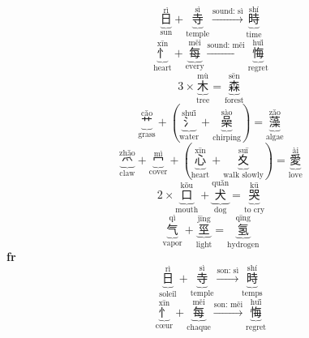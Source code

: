 \documentclass[12pt]{article}\usepackage[margin=1.5cm]{geometry}
\begin{document}
\[ \underbrace{\overset{\text{rì}}{\text{日}}}_{\text{sun}} + \underbrace{\overset{\text{sì}}{\text{寺}}}_{\text{temple}} \xrightarrow{\text{sound: sì}} \underbrace{\overset{\text{shí}}{\text{時}}}_{\text{time}} \]
\[ \underbrace{\overset{\text{xīn}}{\text{忄}}}_{\text{heart}} + \underbrace{\overset{\text{měi}}{\text{每}}}_{\text{every}} \xrightarrow{\text{sound: měi}} \underbrace{\overset{\text{huǐ}}{\text{悔}}}_{\text{regret}} \]
\[ 3\times \underbrace{\overset{\text{mù}}{\text{木}}}_{\text{tree}} = \underbrace{\overset{\text{sēn}}{\text{森}}}_{\text{forest}} \]
\[ \underbrace{\overset{\text{cǎo}}{\text{艹}}}_{\text{grass}} + \left(\underbrace{\overset{\text{shuǐ}}{\text{氵}}}_{\text{water}} + \underbrace{\overset{\text{sào}}{\text{喿}}}_{\text{chirping}}\right) = \underbrace{\overset{\text{zǎo}}{\text{藻}}}_{\text{algae}} \]
\[ \underbrace{\overset{\text{zhǎo}}{\text{爫}}}_{\text{claw}} + \underbrace{\overset{\text{mì}}{\text{冖}}}_{\text{cover}} + \left(\underbrace{\overset{\text{xīn}}{\text{心}}}_{\text{heart}} + \underbrace{\overset{\text{suī}}{\text{夊}}}_{\text{walk slowly}}\right) = \underbrace{\overset{\text{ài}}{\text{愛}}}_{\text{love}} \]
\[ 2\times \underbrace{\overset{\text{kǒu}}{\text{口}}}_{\text{mouth}} + \underbrace{\overset{\text{quǎn}}{\text{犬}}}_{\text{dog}} = \underbrace{\overset{\text{kū}}{\text{哭}}}_{\text{to cry}} \]
\[ \underbrace{\overset{\text{qì}}{\text{气}}}_{\text{vapor}} + \underbrace{\overset{\text{jīng}}{\text{巠}}}_{\text{light}} = \underbrace{\overset{\text{qīng}}{\text{氢}}}_{\text{hydrogen}} \]
\textbf{fr}
\[ \underbrace{\overset{\text{rì}}{\text{日}}}_{\text{soleil}} + \underbrace{\overset{\text{sì}}{\text{寺}}}_{\text{temple}} \xrightarrow{\text{son: sì}} \underbrace{\overset{\text{shí}}{\text{時}}}_{\text{temps}} \]
\[ \underbrace{\overset{\text{xīn}}{\text{忄}}}_{\text{cœur}} + \underbrace{\overset{\text{měi}}{\text{每}}}_{\text{chaque}} \xrightarrow{\text{son: měi}} \underbrace{\overset{\text{huǐ}}{\text{悔}}}_{\text{regret}} \]
\end{document}
